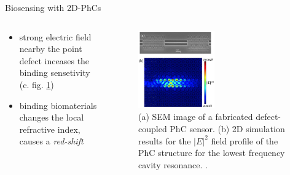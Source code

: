\begin{frame}{Biosensing with 2D-PhCs}
  \begin{columns}

  \begin{column}{0.49\textwidth}
    \begin{itemize}
      \setlength\itemsep{1.2em}
      \item{strong electric field nearby the point defect inceases the binding sensetivity (c. fig. \ref{fig: e_field})}
      \item{binding biomaterials changes the local refractive index, causes a \emph{red-shift}}
    \end{itemize}
  \end{column}

  \begin{column}{0.49\textwidth}
    \begin{figure}
      \centering
      \includegraphics[width=0.5\textwidth]{./bilder/multiplexing_photon.jpg}
      \caption{(a) SEM image of a fabricated defect-coupled PhC sensor. (b) 2D simulation results for the $|E|^2$ field profile of the PhC structure for the lowest frequency cavity resonance.
                \cite{test_Structure}.}
      \label{fig: e_field}
    \end{figure}
  \end{column}

\end{columns}
\end{frame}



